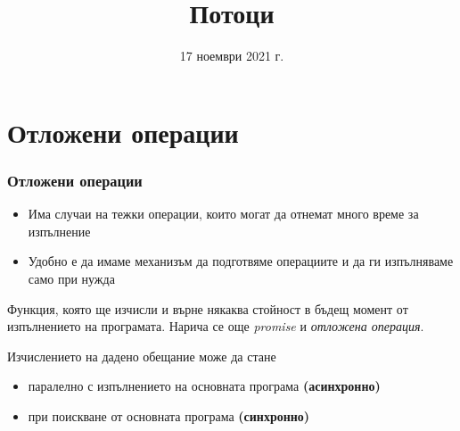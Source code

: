 \documentclass[alsotrans]{beamerswitch}
\title{Потоци}
\date{17 ноември 2021 г.}
\begin{document}
\begin{frame}
  \titlepage
\end{frame}

\section{Отложени операции}

\begin{frame}
  \frametitle{Отложени операции}

  \begin{itemize}[<+->]
  \item Има случаи на тежки операции, които могат да отнемат много време за изпълнение
  \item Удобно е да имаме механизъм да \alert{подготвяме} операциите и да ги \alert{изпълняваме} само при нужда
  \end{itemize}
  \onslide<+->
  \begin{definition}[Обещание]
    Функция, която ще изчисли и върне някаква стойност в бъдещ момент от изпълнението на програмата.
    \onslide<+->
    Нарича се още \emph{promise} и \emph{отложена операция}.
  \end{definition}
  \onslide<+->
  Изчислението на дадено обещание може да стане
  \begin{itemize}[<+->]
  \item паралелно с изпълнението на основната програма \textbf{(асинхронно)}
  \item при поискване от основната програма \textbf{(синхронно)}
  \end{itemize}
\end{frame}
\end{document}
